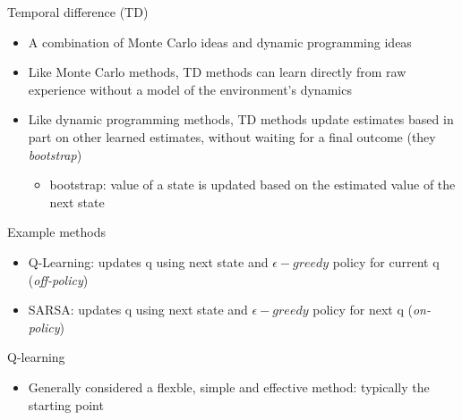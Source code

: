 \documentclass[presentation, 9pt]{beamer}\mode<presentation>{\usetheme{AMSBolognaFC}}
\begin{document}
\begin{frame}{Temporal difference (TD)}
	\begin{itemize}
		\item A combination of Monte Carlo ideas and dynamic programming ideas
		\item Like Monte Carlo methods, TD methods can learn directly from raw experience without a model of the environment's dynamics
		\item Like dynamic programming methods, TD methods update estimates based in part on other learned estimates, without waiting for a final outcome (they \emph{bootstrap})
		\begin{itemize}
			\item bootstrap:  value of a state is updated based on the estimated value of the next state
		\end{itemize}
	\end{itemize}
	\begin{exampleblock}{Example methods}
		\begin{itemize}
			\item Q-Learning: updates q using next state and $\epsilon-greedy$ policy for current q (\emph{off-policy})
			\item SARSA: updates q using next state and $\epsilon-greedy$ policy for next q (\emph{on-policy})
		\end{itemize}
	\end{exampleblock}
	\begin{alertblock}{Q-learning}
		\begin{itemize}
			\item Generally considered a flexble, simple and effective method: typically the starting point
		\end{itemize}
	\end{alertblock}
\end{frame}
\end{document}
